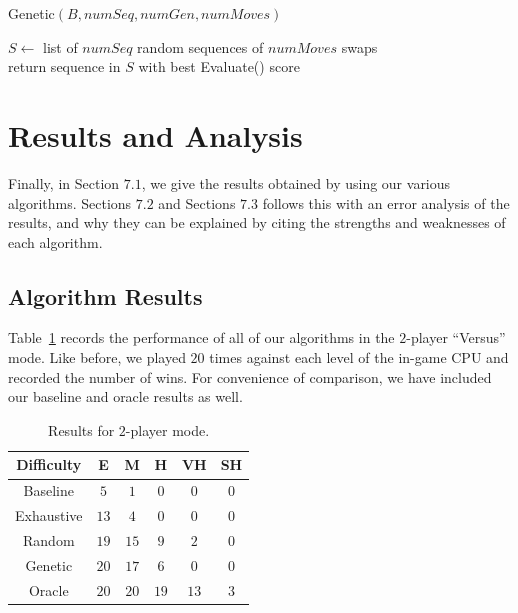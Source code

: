 \documentclass[12pt]{IEEEtran}
\begin{document}
\begin{algorithm}\label{genetic}\small
\caption{\small Genetic$(B, numSeq, numGen, numMoves)$}
$S \gets$ list of $numSeq$ random sequences of $numMoves$ swaps\\
return sequence in $S$ with best Evaluate() score\\
\end{algorithm}

\section{Results and Analysis}

Finally, in Section $7.1$, we give the results obtained by using our various algorithms. Sections $7.2$ and Sections $7.3$ follows this with an error analysis of the results, and why they can be explained by citing the strengths and weaknesses of each algorithm.

\subsection{Algorithm Results}

Table~\ref{tab:versus} records the performance of all of our algorithms in the $2$-player ``Versus'' mode. Like before, we played $20$ times against each level of the in-game CPU and recorded the number of wins. For convenience of comparison, we have included our baseline and oracle results as well.

\begin{table}[ht]
\begin{center}
\begin{tabular}{c||c|c|c|c|c}
Difficulty & E & M & H & VH & SH \\ \hline\hline
Baseline & $5$ & $1$ & $0$ & $0$ & $0$ \\ \hline
Exhaustive & $13$ & $4$ & $0$ & $0$ & $0$ \\ \hline
Random & $19$ & $15$ & $9$ & $2$ & $0$ \\ \hline
Genetic & $20$ & $17$ & $6$ & $0$ & $0$ \\ \hline
Oracle & $20$ & $20$ & $19$ & $13$ & $3$
\end{tabular}
\end{center}
\caption{Results for $2$-player mode.}
\label{tab:versus}
\end{table}
\end{document}
